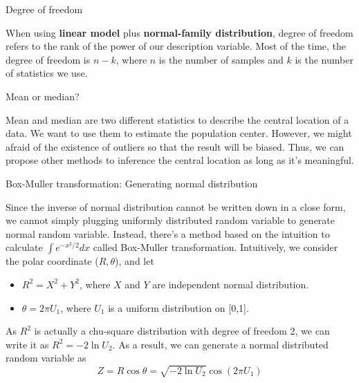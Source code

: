 \documentclass[11pt]{article}
\begin{document}
\begin{remark}{Degree of freedom}
	
When using {\bf linear model} plus {\bf normal-family distribution}, degree of freedom refers to the rank of the power of our description variable. Most of the time, the degree of freedom is $n-k$, where $n$ is the number of samples and $k$ is the number of statistics we use. 
\end{remark}


\begin{remark}{Mean or median?}
	
Mean and median are two different statistics to describe the central location of a data. We want to use them to estimate the population center. However, we might afraid of the existence of outliers so that the result will be biased. Thus, we can propose other methods to inference the central location as long as it's meaningful.
\end{remark}

\begin{remark}{Box-Muller transformation: Generating normal distribution}
	
Since the inverse of normal distribution cannot be written down in a close form, we cannot simply plugging uniformly distributed random variable to generate normal random variable. Instead, there's a method based on the intuition to calculate $\int e^{-x^2/2}dx$ called Box-Muller transformation. Intuitively, we consider the polar coordinate ($R,\theta$), and let
\begin{itemize}
	\item $R^2 = X^2+Y^2$, where $X$ and $Y$ are independent normal distribution.
	\item $\theta = 2\pi U_1$, where $U_1$ is a uniform distribution on [0,1].
\end{itemize}
As $R^2$ is actually a chu-square distribution with degree of freedom 2, we can write it as $R^2=-2\ln U_2$. As a result, we can generate a normal distributed random variable as
$$Z = R\cos\theta = \sqrt{-2\ln U_2}\cos(2\pi U_1)$$
\end{remark}
\end{document}
